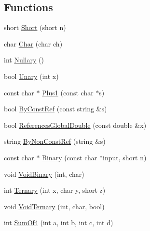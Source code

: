 \subsection*{Functions}
\begin{DoxyCompactItemize}
\item 
short \hyperlink{namespacetesting_1_1gmock__generated__actions__test_a7c442b3594b6717b8d499781a82170b2}{Short} (short n)
\item 
char \hyperlink{namespacetesting_1_1gmock__generated__actions__test_aa07e216a4c9d492fb7e7c8fde949bc8f}{Char} (char ch)
\item 
int \hyperlink{namespacetesting_1_1gmock__generated__actions__test_acb3d926ebbe88529c38d95f5e61573ef}{Nullary} ()
\item 
bool \hyperlink{namespacetesting_1_1gmock__generated__actions__test_a61f0e6c3f2c07079299f1d6e1667ab92}{Unary} (int x)
\item 
const char $\ast$ \hyperlink{namespacetesting_1_1gmock__generated__actions__test_a75e901c6d28c591c53a54320a294da55}{Plus1} (const char $\ast$s)
\item 
bool \hyperlink{namespacetesting_1_1gmock__generated__actions__test_a5886409b3306d3ff2fe548f9747f1de8}{By\+Const\+Ref} (const string \&s)
\item 
bool \hyperlink{namespacetesting_1_1gmock__generated__actions__test_a3e552b41de08f0516f4b0e32fed68a61}{References\+Global\+Double} (const double \&x)
\item 
string \hyperlink{namespacetesting_1_1gmock__generated__actions__test_a2d12f232cedb11c5955db0ebb1429eb2}{By\+Non\+Const\+Ref} (string \&s)
\item 
const char $\ast$ \hyperlink{namespacetesting_1_1gmock__generated__actions__test_a3ec2020ddbfa6f2e993e0f88be1e691f}{Binary} (const char $\ast$input, short n)
\item 
void \hyperlink{namespacetesting_1_1gmock__generated__actions__test_af957302d6c2b4dacd31385f2a34b529f}{Void\+Binary} (int, char)
\item 
int \hyperlink{namespacetesting_1_1gmock__generated__actions__test_a1b234626e33284c4159ea666d240d5ed}{Ternary} (int x, char y, short z)
\item 
void \hyperlink{namespacetesting_1_1gmock__generated__actions__test_a7b1b519421c70b90ea3c818d4cf565ac}{Void\+Ternary} (int, char, bool)
\item 
int \hyperlink{namespacetesting_1_1gmock__generated__actions__test_a2a5879c060adacf27c3528260172a7be}{Sum\+Of4} (int a, int b, int c, int d)

\end{DoxyCompactItemize}
